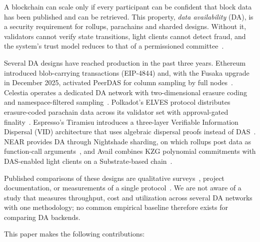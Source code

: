 
A blockchain can scale only if every participant can be confident that block data has been published and can be retrieved.
This property, \emph{data availability} (DA), is a security requirement for rollups, parachains and sharded designs.
Without it, validators cannot verify state transitions, light clients cannot detect fraud, and the system's trust model reduces to that of a permissioned committee~\cite{Saif_Survey_DA_Rollups}.

Several DA designs have reached production in the past three years.
Ethereum introduced blob-carrying transactions (EIP-4844) and, with the Fusaka upgrade in December 2025, activated PeerDAS for column sampling by full nodes~\cite{EIP-4844, EIP-7594}.
Celestia operates a dedicated DA network with two-dimensional erasure coding and namespace-filtered sampling~\cite{AlBassam_LazyLedger}.
Polkadot's ELVES protocol distributes erasure-coded parachain data across its validator set with approval-gated finality~\cite{Jeff_Burdges_ELVES}.
Espresso's Tiramisu introduces a three-layer Verifiable Information Dispersal (VID) architecture that uses algebraic dispersal proofs instead of DAS~\cite{Espresso:Hotshot_and_Triamisu}.
NEAR provides DA through Nightshade sharding, on which rollups post data as function-call arguments~\cite{NEAR_Nightshade_Scaling_Blockchain}, and Avail combines KZG polynomial commitments with DAS-enabled light clients on a Substrate-based chain~\cite{Avail_The_DA_Blockchain}.

Published comparisons of these designs are qualitative surveys~\cite{Saif_Survey_DA_Rollups, Thibault2022Rollups}, project documentation, or measurements of a single protocol~\cite{Heimbach2025BlobFee, Lee2025BlobSharing}.
We are not aware of a study that measures throughput, cost and utilization across several DA networks with one methodology; no common empirical baseline therefore exists for comparing DA backends.

This paper makes the following contributions:


